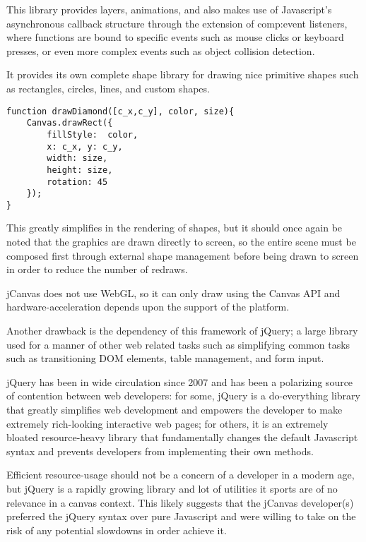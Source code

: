 This library provides layers, animations, and also makes use of Javascript's asynchronous callback structure through the extension of \gls{comp:event listeners}, where functions are bound to specific events such as mouse clicks or keyboard presses, or even more complex events such as object collision detection\citep{jcanvas}.

It provides its own complete shape library for drawing nice primitive shapes such as rectangles, circles, lines, and custom shapes.


\begingroup
\begin{spacing}{1}
\begin{lstlisting}[label=code:jCanvasapi]
function drawDiamond([c_x,c_y], color, size){
	Canvas.drawRect({
		fillStyle:  color,
		x: c_x,	y: c_y,
		width: size,
		height: size,
		rotation: 45
	});
}
\end{lstlisting}
\vspace{-10pt}
\end{spacing}
\endgroup

This greatly simplifies in the rendering of shapes, but it should once again be noted that the graphics are drawn directly to screen, so the entire scene must be composed first through external shape management before being drawn to screen in order to reduce the number of redraws.

jCanvas does not use WebGL, so it can only draw using the Canvas API and hardware-acceleration depends upon the support of the platform.

Another drawback is the dependency of this framework of jQuery; a large library used for a manner of other web related tasks such as simplifying common tasks such as transitioning DOM elements, table management, and form input.

jQuery has been in wide circulation since 2007 and has been a polarizing source of contention between web developers: for some, jQuery is a do-everything library that greatly simplifies web development and empowers the developer to make extremely rich-looking interactive web pages; for others, it is an extremely bloated resource-heavy library that fundamentally changes the default Javascript syntax and prevents developers from implementing their own methods.

Efficient resource-usage should not be a concern of a developer in a modern age, but jQuery is a rapidly growing library  and lot of utilities it sports are of no relevance in a canvas context. This likely suggests that the jCanvas developer(s) preferred the jQuery syntax over pure Javascript and were willing to take on the risk of any potential slowdowns in order achieve it.



